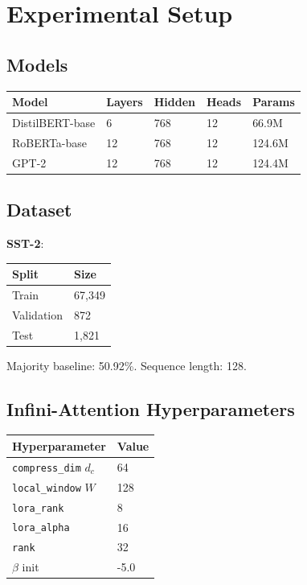 
\section{Experimental Setup}

\subsection{Models}

\begin{table}[H]
\centering
\small
\begin{tabular}{lllll}
\toprule
\textbf{Model} & \textbf{Layers} & \textbf{Hidden} & \textbf{Heads} & \textbf{Params} \\
\midrule
DistilBERT-base & 6 & 768 & 12 & 66.9M \\
RoBERTa-base & 12 & 768 & 12 & 124.6M \\
GPT-2 & 12 & 768 & 12 & 124.4M \\
\bottomrule
\end{tabular}
\end{table}

\subsection{Dataset}

\textbf{SST-2}:

\begin{table}[H]
\centering
\small
\begin{tabular}{ll}
\toprule
\textbf{Split} & \textbf{Size} \\
\midrule
Train & 67,349 \\
Validation & 872 \\
Test & 1,821 \\
\bottomrule
\end{tabular}
\end{table}

Majority baseline: 50.92\%. Sequence length: 128.

\subsection{Infini-Attention Hyperparameters}

\begin{table}[H]
\centering
\small
\begin{tabular}{ll}
\toprule
\textbf{Hyperparameter} & \textbf{Value} \\
\midrule
\texttt{compress\_dim} $d_c$ & 64 \\
\texttt{local\_window} $W$ & 128 \\
\texttt{lora\_rank} & 8 \\
\texttt{lora\_alpha} & 16 \\
\texttt{rank} & 32 \\
$\beta$ init & -5.0 \\
\bottomrule
\end{tabular}
\end{table}

